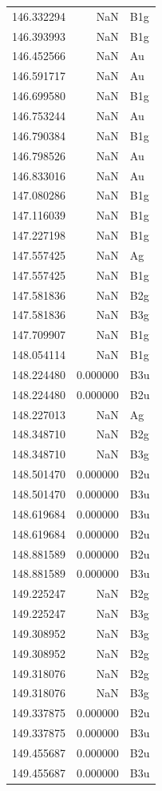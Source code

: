 \begin{longtable}{rrl}
146.332294 & NaN & B1g \\
146.393993 & NaN & B1g \\
146.452566 & NaN & Au \\
146.591717 & NaN & Au \\
146.699580 & NaN & B1g \\
146.753244 & NaN & Au \\
146.790384 & NaN & B1g \\
146.798526 & NaN & Au \\
146.833016 & NaN & Au \\
147.080286 & NaN & B1g \\
147.116039 & NaN & B1g \\
147.227198 & NaN & B1g \\
147.557425 & NaN & Ag \\
147.557425 & NaN & B1g \\
147.581836 & NaN & B2g \\
147.581836 & NaN & B3g \\
147.709907 & NaN & B1g \\
148.054114 & NaN & B1g \\
148.224480 & 0.000000 & B3u \\
148.224480 & 0.000000 & B2u \\
148.227013 & NaN & Ag \\
148.348710 & NaN & B2g \\
148.348710 & NaN & B3g \\
148.501470 & 0.000000 & B2u \\
148.501470 & 0.000000 & B3u \\
148.619684 & 0.000000 & B3u \\
148.619684 & 0.000000 & B2u \\
148.881589 & 0.000000 & B2u \\
148.881589 & 0.000000 & B3u \\
149.225247 & NaN & B2g \\
149.225247 & NaN & B3g \\
149.308952 & NaN & B3g \\
149.308952 & NaN & B2g \\
149.318076 & NaN & B2g \\
149.318076 & NaN & B3g \\
149.337875 & 0.000000 & B2u \\
149.337875 & 0.000000 & B3u \\
149.455687 & 0.000000 & B2u \\
149.455687 & 0.000000 & B3u \\

\end{longtable}
